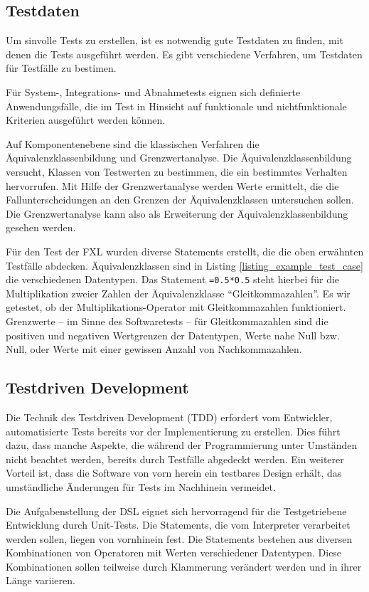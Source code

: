 \subsection{Testdaten}

Um sinvolle Tests zu erstellen, ist es notwendig gute Testdaten zu finden, mit denen die Tests ausgeführt werden. Es gibt verschiedene Verfahren, um Testdaten für Testfälle zu bestimen.

Für System-, Integrations- und Abnahmetests eignen sich definierte Anwendungsfälle, die im Test in Hinsicht auf funktionale und nichtfunktionale Kriterien ausgeführt werden können.

Auf Komponentenebene sind die klassischen Verfahren die Äquivalenzklassenbildung und Grenzwertanalyse. Die Äquivalenzklassenbildung versucht, Klassen von Testwerten zu bestimmen, die ein bestimmtes Verhalten hervorrufen. Mit Hilfe der Grenzwertanalyse werden Werte ermittelt, die die Fallunterscheidungen an den Grenzen der Äquivalenzklassen untersuchen sollen. Die Grenzwertanalyse kann also als Erweiterung der Äquivalenzklassenbildung gesehen werden.

Für den Test der FXL wurden diverse Statements erstellt, die die oben erwähnten Testfälle abdecken. Äquivalenzklassen sind in Listing \ref{listing_example_test_case} die verschiedenen Datentypen. Das Statement \texttt{=0.5*0.5} steht hierbei für die Multiplikation zweier Zahlen der Äquivalenzklasse ``Gleitkommazahlen''. Es wir getestet, ob der Multiplikations-Operator mit Gleitkommazahlen funktioniert. Grenzwerte -- im Sinne des Softwaretests -- für Gleitkommazahlen sind die positiven und negativen Wertgrenzen der Datentypen, Werte nahe Null bzw. Null, oder Werte mit einer gewissen Anzahl von Nachkommazahlen.

\subsection{Testdriven Development}

Die Technik des Testdriven Development (TDD) erfordert vom Entwickler, automatisierte Tests bereits vor der Implementierung zu erstellen\cite{Beck03}. Dies führt dazu, dass manche Aspekte, die während der Programmierung unter Umständen nicht beachtet werden, bereits durch Testfälle abgedeckt werden. Ein weiterer Vorteil ist, dass die Software von vorn herein ein testbares Design erhält, das umständliche Änderungen für Tests im Nachhinein vermeidet.

Die Aufgabenstellung der DSL eignet sich hervorragend für die Testgetriebene Entwicklung durch Unit-Tests. Die Statements, die vom Interpreter verarbeitet werden sollen, liegen von vornhinein fest. Die Statements bestehen aus diversen Kombinationen von Operatoren mit Werten verschiedener Datentypen. Diese Kombinationen sollen teilweise durch Klammerung verändert werden und in ihrer Länge variieren.







